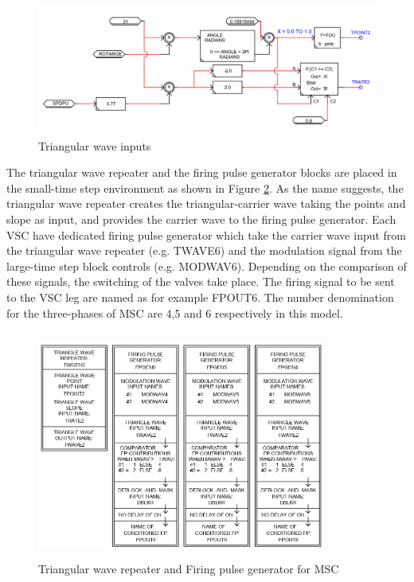 \begin{figure}[H]
\centering
    \includegraphics[height = 4.5cm,width = 12.5cm]{Diagrams/Appendix_A/Triangular_wave_input.PNG}
    \caption{Triangular wave inputs}
    \label{fig:Triangular_wave_input}
\end{figure}

The triangular wave repeater and the firing pulse generator blocks are placed in the small-time step environment as shown in Figure \ref{fig:Firing_blocks_MSC}. As the name suggests, the triangular wave repeater creates the triangular-carrier wave taking the points and slope as input, and provides the carrier wave to the firing pulse generator. Each \gls{VSC} have dedicated firing pulse generator which take the carrier wave input from the triangular wave repeater (e.g. TWAVE6) and the modulation signal from the large-time step block controls (e.g. MODWAV6). Depending on the comparison of these signals, the switching of the valves take place. The firing signal to be sent to the \gls{VSC} leg are named as for example FPOUT6. The number denomination for the three-phases of \gls{MSC} are 4,5 and 6 respectively in this model.  

\begin{figure}[H]
\centering
    \includegraphics[height = 7.5cm,width = 9.5cm]{Diagrams/Appendix_A/Firing_blocks_MSC.PNG}
    \caption{Triangular wave repeater and Firing pulse generator for MSC}
    \label{fig:Firing_blocks_MSC}
\end{figure}

